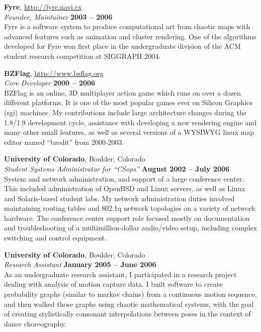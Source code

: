 \documentclass[margin,line]{resume}
\begin{document}
\begin{resume}
    {\bf Fyre}, \href{http://fyre.navi.cx}{http://fyre.navi.cx} \vspace{2mm}\\\vspace{1mm}%
    {\sl Founder, Maintainer} \hfill {\bf 2003 -- 2006}\\
    Fyre is a software system to produce computational art from chaotic maps
    with advanced features such as animation and cluster rendering. One of the
    algorithms developed for Fyre won first place in the undergraduate division
    of the ACM student research competition at SIGGRAPH 2004.

    \ifcv
        {\bf BZFlag}, \href{http://www.bzflag.org}{http://www.bzflag.org} \vspace{2mm}\\\vspace{1mm}%
        {\sl Core Developer} \hfill {\bf 2000 -- 2006}\\
        BZFlag is an online, 3D multiplayer action game which runs on over a dozen
        different platforms. It is one of the most popular games ever on Silicon
        Graphics (sgi) machines. My contributions include large architecture changes
        during the 1.8/1.9 development cycle, assistance with developing a new
        rendering engine and many other small features, as well as several versions
        of a WYSIWYG linux map editor named “bzedit” from 2000-2003.

        {\bf University of Colorado}, Boulder, Colorado \vspace{2mm}\\\vspace{1mm}%
        {\sl Student Systems Administrator for ``CSops''} \hfill {\bf August 2002 -- July 2006}\\
        System and network administration, and support of a large conference
        center. This included administration of OpenBSD and Linux servers, as well
        as Linux and Solaris-based student labs. My network administration duties
        involved maintaining routing tables and 802.1q network topologies on a
        variety of network hardware. The conference center support role focused
        mostly on documentation and troubleshooting of a multimillion-dollar
        audio/video setup, including complex switching and control equipment.

        {\bf University of Colorado}, Boulder, Colorado \vspace{2mm}\\\vspace{1mm}%
        {\sl Research Assistant} \hfill {\bf January 2005 -- June 2006}\\
        As an undergraduate research assistant, I participated in a research
        project dealing with analysis of motion capture data. I built software to
        create probability graphs (similar to markov chains) from a continuous
        motion sequence, and then walked those graphs using chaotic mathematical
        systems, with the goal of creating stylistically consonant interpolations
        between poses in the context of dance choreography.


\end{resume}
\end{document}
